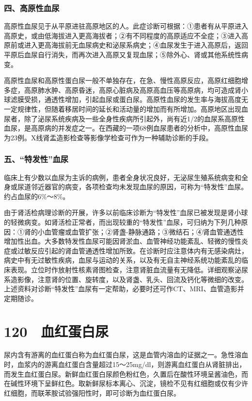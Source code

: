 \subsubsection{四、高原性血尿}

高原性血尿见于从平原进驻高原地区的人。此症诊断可根据：①患者有从平原进入高原史，或由低海拔进入更高海拔者；②有不同程度的高原适应不全症；③进入高原前或进入更高海拔前无血尿病史和泌尿系病史；④血尿发生于进入高原后，返回平原后血尿自行消失，而再次进入高原又复现血尿；⑤除外心、肾或其他系统性病变。

高原性血尿和高原性蛋白尿一般不单独存在，在急、慢性高原反应，高原红细胞增多症，高原肺水肿、高原昏迷，高原心脏病及高原高血压等高原病，均可造成肾小球滤膜受损，通透性增加，引起血尿或蛋白尿。高原性血尿的发生率与海拔高度无一定规律性，但随着移居时间的延长和活动量的增加而有所增加。高原地区出现血尿者，除了泌尿系统疾病及一些全身性疾病所引起外，尚有近1/2的血尿系高原性血尿，是高原病的并发症之一。在西藏的一项68例血尿患者的分析中，高原性血尿为23例。X线肾盂造影检查等影像学检查可作为一种辅助诊断的手段。

\subsubsection{五、“特发性”血尿}

临床上有少数以血尿为主诉的病例，患者全身状况良好，无泌尿生殖系统病变和全身或尿道邻近器官的病变，各项检查均未发现血尿的原因，可称为“特发性”血尿。约占血尿的6\%～8\%。

由于肾活检病理诊断的开展，许多以前临床诊断为“特发性”血尿已被发现是肾小球的轻微病变。如肾活检正常者，而出现较重的“特发性”血尿，可归纳为下列几种原因：①肾的小血管瘤或血管扩张；②肾盏-静脉通路；③微结石；④肾血管通透性增加性出血。大多数特发性血尿可能因肾淤血、血管神经功能紊乱、轻微的慢性炎症或过敏反应引起的肾血管通透性增加所致。在诊断时应注意体内有无感染病灶，病史中有无过敏性疾病，血尿与运动的关系，以及有无自主神经系统功能紊乱的临床表现。立位时作放射性核素肾图检查，注意肾脏血流量有无降低。详细观察泌尿系造影像，注意肾的位置、旋转度，以及肾盏、乳头、回流及钙化等微细的改变。上述资料对诊断“特发性”血尿有一定帮助，必要时还可作CT、MRI、血管造影并定期随诊。

\protect\hypertarget{text00281.html}{}{}

\section{120　血红蛋白尿}

尿内含有游离的血红蛋白称为血红蛋白尿，这是血管内溶血的证据之一。急性溶血时，血浆内的游离血红蛋白含量超过15～25mg/dl，则游离血红蛋白从肾脏排出，而发生血红蛋白尿。新鲜血红蛋白尿颜色粉红色，久置后在酸性环境呈酱油色，而在碱性环境下呈鲜红色。取新鲜尿标本离心、沉淀，镜检不见有红细胞或仅有少许红细胞，而联苯胺试验强阳性时，即可诊断为血红蛋白尿。

